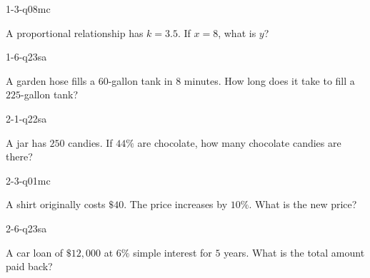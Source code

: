 
\begin{practiceQuestion}{1-3-q08}{mc}
\begin{questionText}
A proportional relationship has $k = 3.5$. If $x = 8$, what is $y$?
\end{questionText}
\end{practiceQuestion}

\begin{practiceQuestion}{1-6-q23}{sa}
\begin{questionText}
A garden hose fills a $60$-gallon tank in $8$ minutes. How long does it take to fill a $225$-gallon tank?
\end{questionText}
\end{practiceQuestion}

\begin{practiceQuestion}{2-1-q22}{sa}
\begin{questionText}
A jar has $250$ candies. If $44\%$ are chocolate, how many chocolate candies are there?
\end{questionText}
\end{practiceQuestion}

\begin{practiceQuestion}{2-3-q01}{mc}
\begin{questionText}
A shirt originally costs $\$40$. The price increases by $10\%$. What is the new price?
\end{questionText}
\end{practiceQuestion}

\begin{practiceQuestion}{2-6-q23}{sa}
\begin{questionText}
A car loan of $\$12{,}000$ at $6\%$ simple interest for $5$ years. What is the total amount paid back?
\end{questionText}
\end{practiceQuestion}

